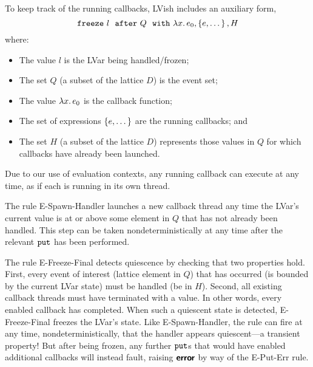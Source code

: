 

\noindent
To keep track of the running callbacks, LVish includes an auxiliary form,{
\[
   \mbox{\texttt{freeze}}~l~~{\mbox{\texttt{after}}}~Q~~{\mbox{\texttt{with}}}~\lambda x.\,e_0, \left\{e, \dots\right\}, H
\]}%
where:
\begin{itemize}
\item The value $l$ is the LVar being handled/frozen;
\item The set $Q$ (a subset of the lattice $D$) is the event set;
\item The value $\lambda x.\,e_0$ is the callback function;
\item The set of expressions $\left\{e, \dots\right\}$ are the running callbacks; and
\item The set $H$ (a subset of the lattice $D$) represents those values in $Q$
  for which callbacks have already been launched.
\end{itemize}
Due to our use of evaluation contexts, any running callback can execute at any
time, as if each is running in its own thread.

The rule {\sc E-Spawn-Handler} launches a new callback thread any time the
LVar's current value is at or above some element in $Q$ that has not already been
handled.  This step can be taken nondeterministically at any time after the
relevant $\mbox{\texttt{put}}$ has been performed.

The rule {\sc E-Freeze-Final} detects quiescence by checking that two
properties hold.  First, every event of interest (lattice element in $Q$) that has
occurred (is bounded by the current LVar state) must be handled (be in $H$).
Second, all existing callback threads must have terminated with a value.  In
other words, every enabled callback has completed.  When such a quiescent state
is detected, {\sc E-Freeze-Final} freezes the LVar's state.  Like {\sc
  E-Spawn-Handler}, the rule can fire at any time, nondeterministically, that
the handler appears quiescent---a transient property!  But after being frozen,
any further $\mbox{\texttt{put}}$s that would have enabled additional callbacks will instead
fault, raising $\textbf{\textsf{error}}$ by way of the {\sc E-Put-Err} rule.

